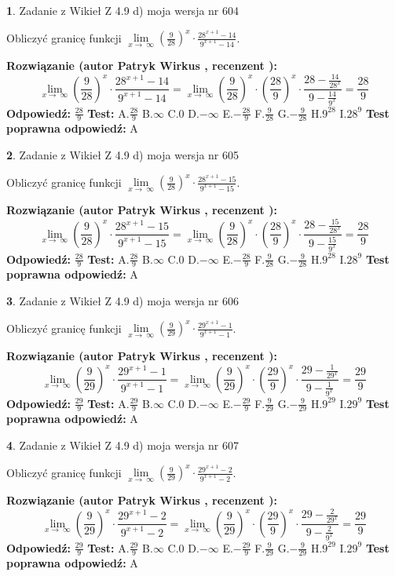 \documentclass[12pt, a4paper]{article}
\theoremstyle{definition} %
\newtheorem{zad}{}
\newcommand{\zadStart}[1]{\begin{zad}#1\newline}
\newcommand{\zadStop}{\end{zad}}
\newcommand{\rozwStart}[2]{\noindent \textbf{Rozwiązanie (autor #1 , recenzent #2): }\newline}
\newcommand{\rozwStop}{\newline}
\newcommand{\odpStart}{\noindent \textbf{Odpowiedź:}\newline}
\newcommand{\odpStop}{\newline}
\newcommand{\testStart}{\noindent \textbf{Test:}\newline}
\newcommand{\testStop}{\newline}
\newcommand{\kluczStart}{\noindent \textbf{Test poprawna odpowiedź:}\newline}
\newcommand{\kluczStop}{\newline}
\begin{document}
\zadStart{Zadanie z Wikieł Z 4.9 d) moja wersja nr 604}


Obliczyć granicę funkcji  $\lim\limits_{x\to\ \infty}(\frac{9}{28})^{x}\cdot\frac{28^{x+1}-14}{9^{x+1}-14}$.
\zadStop
\rozwStart{Patryk Wirkus}{}
$$\lim\limits_{x\to\ \infty}(\frac{9}{28})^{x}\cdot\frac{28^{x+1}-14}{9^{x+1}-14}=\lim\limits_{x\to\ \infty}(\frac{9}{28})^{x}\cdot(\frac{28}{9})^{x} \cdot \frac{28-\frac{14}{28^{x}}}{9-\frac{14}{9^{x}}} = \frac{28}{9}$$
\rozwStop
\odpStart
$\frac{28}{9}$
\odpStop
\testStart
A.$\frac{28}{9}$ B.$\infty$ C.$0$ D.$-\infty$ E.$-\frac{28}{9}$
F.$\frac{9}{28}$ G.$-\frac{9}{28}$
H.$9^{28}$
I.$28^{9}$
\testStop
\kluczStart
A
\kluczStop



\zadStart{Zadanie z Wikieł Z 4.9 d) moja wersja nr 605}


Obliczyć granicę funkcji  $\lim\limits_{x\to\ \infty}(\frac{9}{28})^{x}\cdot\frac{28^{x+1}-15}{9^{x+1}-15}$.
\zadStop
\rozwStart{Patryk Wirkus}{}
$$\lim\limits_{x\to\ \infty}(\frac{9}{28})^{x}\cdot\frac{28^{x+1}-15}{9^{x+1}-15}=\lim\limits_{x\to\ \infty}(\frac{9}{28})^{x}\cdot(\frac{28}{9})^{x} \cdot \frac{28-\frac{15}{28^{x}}}{9-\frac{15}{9^{x}}} = \frac{28}{9}$$
\rozwStop
\odpStart
$\frac{28}{9}$
\odpStop
\testStart
A.$\frac{28}{9}$ B.$\infty$ C.$0$ D.$-\infty$ E.$-\frac{28}{9}$
F.$\frac{9}{28}$ G.$-\frac{9}{28}$
H.$9^{28}$
I.$28^{9}$
\testStop
\kluczStart
A
\kluczStop



\zadStart{Zadanie z Wikieł Z 4.9 d) moja wersja nr 606}


Obliczyć granicę funkcji  $\lim\limits_{x\to\ \infty}(\frac{9}{29})^{x}\cdot\frac{29^{x+1}-1}{9^{x+1}-1}$.
\zadStop
\rozwStart{Patryk Wirkus}{}
$$\lim\limits_{x\to\ \infty}(\frac{9}{29})^{x}\cdot\frac{29^{x+1}-1}{9^{x+1}-1}=\lim\limits_{x\to\ \infty}(\frac{9}{29})^{x}\cdot(\frac{29}{9})^{x} \cdot \frac{29-\frac{1}{29^{x}}}{9-\frac{1}{9^{x}}} = \frac{29}{9}$$
\rozwStop
\odpStart
$\frac{29}{9}$
\odpStop
\testStart
A.$\frac{29}{9}$ B.$\infty$ C.$0$ D.$-\infty$ E.$-\frac{29}{9}$
F.$\frac{9}{29}$ G.$-\frac{9}{29}$
H.$9^{29}$
I.$29^{9}$
\testStop
\kluczStart
A
\kluczStop



\zadStart{Zadanie z Wikieł Z 4.9 d) moja wersja nr 607}


Obliczyć granicę funkcji  $\lim\limits_{x\to\ \infty}(\frac{9}{29})^{x}\cdot\frac{29^{x+1}-2}{9^{x+1}-2}$.
\zadStop
\rozwStart{Patryk Wirkus}{}
$$\lim\limits_{x\to\ \infty}(\frac{9}{29})^{x}\cdot\frac{29^{x+1}-2}{9^{x+1}-2}=\lim\limits_{x\to\ \infty}(\frac{9}{29})^{x}\cdot(\frac{29}{9})^{x} \cdot \frac{29-\frac{2}{29^{x}}}{9-\frac{2}{9^{x}}} = \frac{29}{9}$$
\rozwStop
\odpStart
$\frac{29}{9}$
\odpStop
\testStart
A.$\frac{29}{9}$ B.$\infty$ C.$0$ D.$-\infty$ E.$-\frac{29}{9}$
F.$\frac{9}{29}$ G.$-\frac{9}{29}$
H.$9^{29}$
I.$29^{9}$
\testStop
\kluczStart
A
\kluczStop
\end{document}
